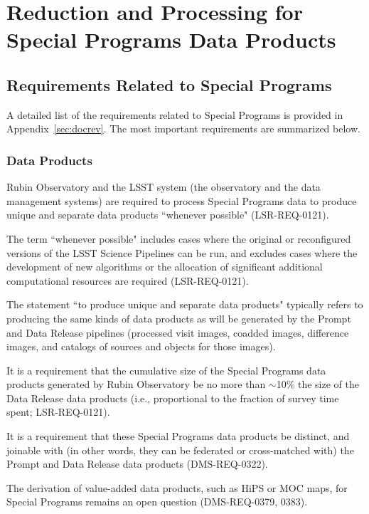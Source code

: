 \documentclass[DM,lsstdoc,toc]{lsstdoc}
\begin{document}
\clearpage
\section{Reduction and Processing for Special Programs Data Products}\label{sec:proc}


\subsection{Requirements Related to Special Programs}\label{ssec:proc_reqs}

A detailed list of the requirements related to Special Programs is provided in Appendix~\ref{sec:docrev}.
The most important requirements are summarized below.

\subsubsection{Data Products}\label{sssec:proc_reqs_dp}

Rubin Observatory and the LSST system (the observatory and the data management systems) are required to process Special Programs data to produce unique and separate data products ``whenever possible" (LSR-REQ-0121).

The term ``whenever possible" includes cases where the original or reconfigured versions of the LSST Science Pipelines can be run, and excludes cases where the development of new algorithms or the allocation of significant additional computational resources are required (LSR-REQ-0121).

The statement ``to produce unique and separate data products" typically refers to producing the same kinds of data products as will be generated by the Prompt and Data Release pipelines (processed visit images, coadded images, difference images, and catalogs of sources and objects for those images).

It is a requirement that the cumulative size of the Special Programs data products generated by Rubin Observatory be no more than $\sim$10\% the size of the Data Release data products (i.e., proportional to the fraction of survey time spent; LSR-REQ-0121).

It is a requirement that these Special Programs data products be distinct, and joinable with (in other words, they can be federated or cross-matched with) the Prompt and Data Release data products (DMS-REQ-0322).

The derivation of value-added data products, such as HiPS or MOC maps, for Special Programs remains an open question (DMS-REQ-0379, 0383).
\end{document}

